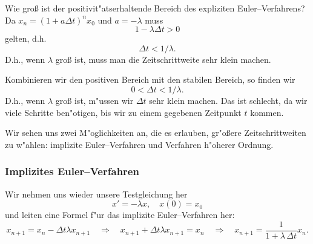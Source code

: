 \begin{bspX}
Wie gro\ss{} ist der positivit"atserhaltende Bereich des expliziten Euler--Verfahrens?\\
Da  $x_n =(1+a\Delta t)^n x_0$ und $a=-\lambda$ muss
$$ 1-\lambda\Delta t >0$$
gelten, d.h.  
$$\Delta t < 1/\lambda.$$
D.h., wenn $\lambda$ gro\ss{} ist, muss man die Zeitschrittweite 
sehr klein machen.
\end{bspX}
Kombinieren wir den positiven Bereich mit den stabilen Bereich, so finden wir 
$$ 0<\Delta t < 1/\lambda.$$
D.h., wenn $\lambda$ gro\ss{} ist, m"ussen wir $\Delta t$ sehr klein machen. 
Das ist schlecht, da wir viele Schritte ben"otigen, bis wir zu einem gegebenen 
Zeitpunkt $t$ kommen.\par\medskip
\par\medskip
Wir sehen uns zwei M"oglichkeiten an, die es erlauben, 
gr"o\ss{}ere Zeitschrittweiten 
zu w"ahlen: implizite Euler--Verfahren und Verfahren h"oherer Ordnung. 
\subsubsection{Implizites Euler--Verfahren }
\begin{bspX} Wir nehmen uns wieder unsere Testgleichung her
$$ x' = -\lambda x,\quad x(0) = x_0$$
und leiten eine Formel f"ur das implizite Euler--Verfahren her:
$$ x_{n+1} = x_n-\Delta t \lambda x_{n+1}
\quad \Rightarrow\quad
x_{n+1}+ \Delta t \lambda x_{n+1} = x_n
\quad \Rightarrow\quad
x_{n+1} = \frac 1 {1+\lambda\, \Delta t} x_n.$$
\end{bspX}

